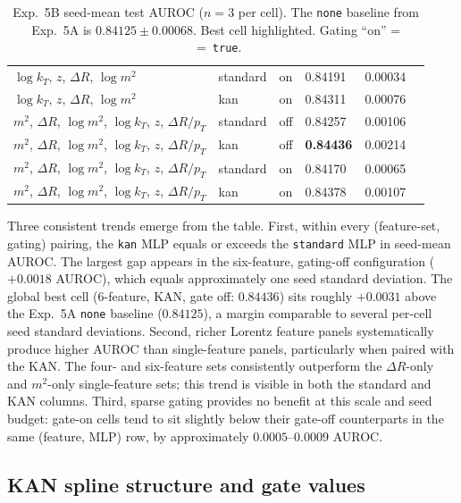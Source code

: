 \begin{table}[h]
\begin{tabular}{llllrr}
$\log k_T$, $z$, $\Delta R$, $\log m^2$   & standard & on  & 0.84191 & 0.00034 \\
$\log k_T$, $z$, $\Delta R$, $\log m^2$   & kan      & on  & 0.84311 & 0.00076 \\
\addlinespace
$m^2$, $\Delta R$, $\log m^2$, $\log k_T$, $z$, $\Delta R/p_T$  & standard & off & 0.84257 & 0.00106 \\
$m^2$, $\Delta R$, $\log m^2$, $\log k_T$, $z$, $\Delta R/p_T$  & kan      & off & \textbf{0.84436} & 0.00214 \\
$m^2$, $\Delta R$, $\log m^2$, $\log k_T$, $z$, $\Delta R/p_T$  & standard & on  & 0.84170 & 0.00065 \\
$m^2$, $\Delta R$, $\log m^2$, $\log k_T$, $z$, $\Delta R/p_T$  & kan      & on  & 0.84378 & 0.00107 \\
\bottomrule
\end{tabular}
\caption{Exp.\ 5B seed-mean test AUROC ($n = 3$ per cell). The
\texttt{none} baseline from Exp.\ 5A is $0.84125 \pm 0.00068$.
Best cell highlighted. Gating ``on'' = ~=~\texttt{true}.}
\label{tab:5b_auroc}
\end{table}

Three consistent trends emerge from the table. First, within every
(feature-set, gating) pairing, the \texttt{kan} MLP equals or exceeds the
\texttt{standard} MLP in seed-mean AUROC. The largest gap appears in the
six-feature, gating-off configuration ($+0.0018$ AUROC), which equals
approximately one seed standard deviation. The global best cell (6-feature,
KAN, gate off: $0.84436$) sits roughly $+0.0031$ above the Exp.\ 5A
\texttt{none} baseline ($0.84125$), a margin comparable to several per-cell
seed standard deviations. Second, richer Lorentz feature panels
systematically produce higher AUROC than single-feature panels, particularly
when paired with the KAN. The four- and six-feature sets consistently
outperform the $\Delta R$-only and $m^2$-only single-feature sets; this
trend is visible in both the standard and KAN columns. Third, sparse gating
provides no benefit at this scale and seed budget: gate-on cells tend to
sit slightly below their gate-off counterparts in the same (feature, MLP)
row, by approximately $0.0005$--$0.0009$ AUROC.

\subsection{KAN spline structure and gate values}
\label{sec:5b_interp}

